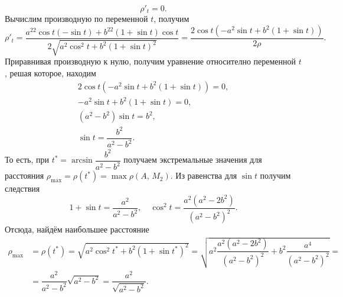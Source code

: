 $$
\rho'_t = 0.
$$
Вычислим производную по переменной $t$, получим
$$
\rho'_t = \dfrac{a^22\cos{t}(-\sin{t}) + b^22(1+\sin{t})\cos{t}}{2\sqrt{a^2\cos^2{t} + b^2(1 + \sin{t})^2}} = \dfrac{2\cos{t}(-a^2\sin{t} + b^2(1+\sin{t}))}{2\rho}.
$$
Приравнивая производную к нулю, получим уравнение относително переменной $t$, решая которое, находим
$$
\begin{array}{c}
2\cos{t}(-a^2\sin{t} + b^2(1+\sin{t})) = 0, \\[4pt]
-a^2\sin{t} + b^2(1+\sin{t}) = 0,			\\[4pt]
(a^2-b^2)\sin{t} = b^2,						\\[4pt]
\sin{t} = \dfrac{b^2}{a^2-b^2}.
\end{array}
$$
То есть, при $t^{\ast} = \arcsin{\dfrac{b^2}{a^2-b^2}}$ получаем экстремальные значения для расстояния $\rho_{\max}=\rho(t^{\ast})=\max\rho(A,\,M_2)$. Из равенства для $\sin{t}$ получим следствия
$$
1+\sin{t} = \dfrac{a^2}{a^2-b^2},\quad \cos^2{t} = \dfrac{a^2(a^2-2b^2)}{(a^2-b^2)^2}.
$$
Отсюда, найдём наибольшее расстояние
$$
\begin{array}{rl}
\rho_{\max}&=\rho(t^{\ast}) = \sqrt{a^2\cos^2{t^{\ast}} + b^2(1 + \sin{t^{\ast}})^2} = 
\sqrt{a^2\dfrac{a^2(a^2-2b^2)}{(a^2-b^2)^2} + b^2\dfrac{a^4}{(a^2-b^2)^2}} =  \\[4pt]
& = \dfrac{a^2}{a^2-b^2}\sqrt{a^2-b^2} = \dfrac{a^2}{\sqrt{a^2-b^2}}.
\end{array}
$$